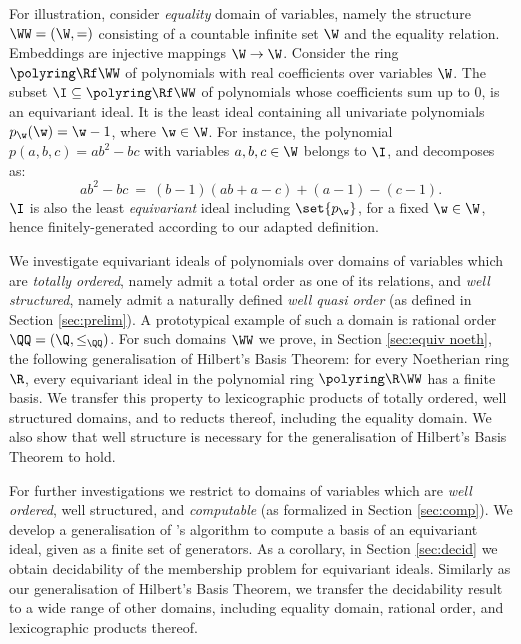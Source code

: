 \begin{slexample}  \label{ex:pol1}
For illustration, consider \emph{equality} domain of variables, namely
the structure $\WW = (\W, =)$ consisting of a countable infinite set 
$\W$ %
and the equality relation.
Embeddings are injective mappings $\W\to\W$.
Consider the ring $\polyring \Rf \WW$ of polynomials with real coefficients over variables $\W$.
The subset $\I\subseteq\polyring \Rf \WW$ of polynomials whose coefficients sum up to 0, is an equivariant ideal.
It is the least ideal containing 
all univariate polynomials
$p_\w(\w) = \w - 1$, where $\w\in\W$.
For instance, the polynomial $p(a,b,c) = ab^2 - bc$ with variables
$a,b,c\in\W$ belongs to $\I$, and decomposes as:
\[
ab^2 - bc \ = \  
(b-1)(ab + a - c) + (a-1) - (c-1).
\]
$\I$ is also the least \emph{equivariant} ideal including  $\set{p_\w}$, 
for a fixed $\w\in\W$,
hence finitely-generated according to our adapted definition.
\end{slexample}

We investigate equivariant ideals of polynomials over domains of variables
which are \emph{totally ordered}, namely admit a total order as one of its relations, and
\emph{well structured}, namely admit a naturally defined
\emph{well quasi order} (as defined in Section \ref{sec:prelim}).
A prototypical example of such a domain is rational order $\QQ=(\Q, \leq_\QQ)$.
For such domains $\WW$ we prove, in Section \ref{sec:equiv noeth}, 
the following generalisation of Hilbert's Basis Theorem:
for every Noetherian ring $\R$, every equivariant ideal in
the polynomial ring $\polyring \R \WW$ 
has a finite basis.
We transfer this property to lexicographic products of totally ordered, well structured domains,
and to reducts thereof,
including the equality domain. %
We also show that well structure is necessary for the generalisation of Hilbert's Basis Theorem to hold.

For further investigations we restrict to domains of variables which are
\emph{well ordered}, well structured, and  
\emph{computable} (as formalized in Section \ref{sec:comp}).
We develop a generalisation of \Bu's algorithm to compute a \Gr basis of an
equivariant ideal, given as a finite set of generators.
As a corollary, in Section \ref{sec:decid} we obtain
decidability of the membership problem for equivariant ideals.
Similarly as our generalisation of Hilbert's Basis Theorem, we transfer
the decidability result to a wide range of other domains, 
including equality domain, rational order, and lexicographic products thereof.

